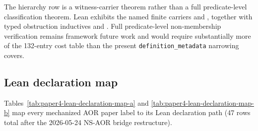 \documentclass[11pt]{article}
\theoremstyle{definition}
\begin{document}
The hierarchy row is a witness-carrier theorem rather than a full
predicate-level classification theorem.  Lean exhibits the named finite carriers
 and ,
together with typed obstruction inductives
 and
.  Full predicate-level non-membership
verification remains framework future work and would require substantially
more of the 132-entry cost table than the present
\texttt{definition\_metadata} narrowing covers.

\subsection{Lean declaration map}
\label{subsec:paper4-declaration-map}

Tables~\ref{tab:paper4-lean-declaration-map-a} and \ref{tab:paper4-lean-declaration-map-b} map every mechanized AOR paper label to its Lean declaration path (47 rows total after the 2026-05-24 NS-AOR bridge restructure).
\end{document}
